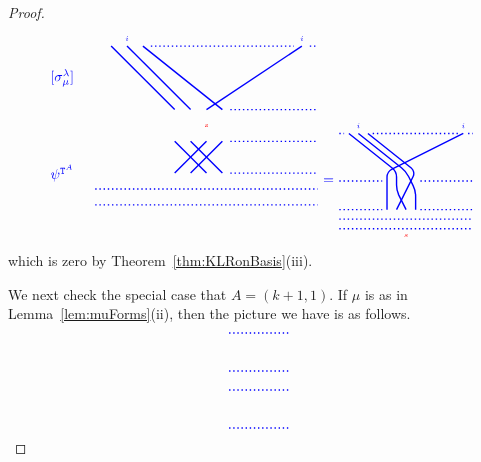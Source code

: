 \documentclass[twoside,11pt,reqno,letter]{amsart}
\numberwithin{equation}{section}
\theoremstyle{definition}  %
\newcommand{\0}{{\bar 0}}
\newcommand{\1}{{\bar 1}}
\newcommand{\la}{\lambda}
\newcommand{\si}{\sigma}
\def\T{{\mathtt T}}
\newenvironment{braid}{%
  \begin{tikzpicture}[baseline=6mm,blue,line width=1pt, scale=0.4,
                      draw/.append style={rounded corners},
                      every node/.append style={font=\tiny}]%
  }{\end{tikzpicture}
}
\begin{document}
{\begin{proof}
\[\begin{braid}
    \draw(1,10)--(5,6);
      \draw(5,4)--(7,2);
    \draw(2,10)node[above]{$i$}--(6,6);
      \draw(6,4)--(8,2);
    \draw(3,10)--(8,6);
      \draw(8,4)--(6,2);

    \draw[dotted](3.5,10)--(12.5,10);

    \draw(13,10)node[above]{$i$}--(7,6);
      \draw(7,5)node[color=red]{$s$};
      \draw(7,4)--(5,2);

    \draw[dotted](13.5,10)--(14,10);
    \draw[dotted](8.5,6)--(14,6);
    \draw[dotted](8.5,4)--(14,4);
    \draw[dotted](8.5,2)--(14,2);

    \draw[dotted](0,1)--(14,1);
    \draw[dotted](0,0)--(14,0);

    \draw(-1,8)node[left,font=\normalsize]{$[\si^\la_\mu]$};
    \draw(-1,2)node[left,font=\normalsize]{$\psi^{\T^A}$};
  \end{braid}
  \begin{braid}\tikzset{scale=0.6,baseline=12mm}
    \draw(0,5)node[font=\normalsize]{$=$};
  \end{braid}
  \begin{braid}\tikzset{scale=0.6,baseline=12mm}
    \draw[dotted](0,10)--(0.5,10);
    \draw[dotted](0,5)--(4.5,5);
    \draw[dotted](0,2)--(4.5,2);

    \draw(1,10)--(6,6)--(6,4)--(7,2);
       \draw(7,0)node[below,color=red]{$s$};
    \draw(2,10)node[above]{$i$}--(7,6)--(8,4)--(8,2);
    \draw(3,10)--(8,6)--(7,4)--(6,2);

    \draw[dotted](3.5,10)--(12.5,10);

    \draw(13,10)node[above]{$i$}--(5,6)--(5,4)--(5,2);

    \draw[dotted](13.5,10)--(14,10);
    \draw[dotted](8.5,5)--(14,5);
    \draw[dotted](8.5,2)--(14,2);

    \draw[dotted](0,1)--(14,1);
    \draw[dotted](0,0)--(14,0);
  \end{braid}
\]
which is zero by Theorem~\ref{thm:KLRonBasis}(iii).




  We next check the special case that $A = (k+1, 1)$. If $\mu$ is as in Lemma~\ref{lem:muForms}(ii), then the picture we have is as follows.
\[
  \begin{braid}\tikzset{scale=0.6,baseline=12mm}
    \draw[dotted](0,10)--(6.5,10);
    \draw[dotted](0,6)--(6.5,6);
    \draw[dotted](0,4)--(6.5,4);
    \draw[dotted](0,0)--(6.5,0);


\end{braid}\]
\end{proof}}
\end{document}
